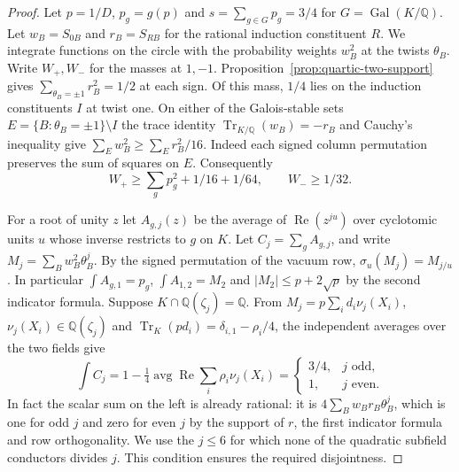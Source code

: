 \documentclass[11pt,a4paper]{article}
\numberwithin{equation}{section}
\begin{document}
\begin{proof}
Let $p=1/D$, $p_g=g(p)$ and $s=\sum_{g\in G}p_g=3/4$ for
$G=\operatorname{Gal}(K/\mathbb Q)$. Let $w_B=S_{0B}$ and
$r_B=S_{RB}$ for the rational induction constituent $R$.
We integrate functions on the circle with the probability weights
$w_B^2$ at the twists $\theta_B$. Write $W_+,W_-$ for the masses
at $1,-1$. Proposition~\ref{prop:quartic-two-support} gives
$\sum_{\theta_B=\pm1}r_B^2=1/2$ at each sign.
Of this mass, $1/4$ lies on the induction constituents $I$ at
twist one. On either of the Galois-stable sets
$E=\{B:\theta_B=\pm1\}\setminus I$ the trace identity
$\operatorname{Tr}_{K/\mathbb Q}(w_B)=-r_B$ and Cauchy's inequality
give $\sum_E w_B^2\ge\sum_E r_B^2/16$. Indeed each signed column
permutation preserves the sum of squares on $E$.
Consequently
\[
 W_+\ge \sum_g p_g^2+1/16+1/64,\qquad W_-\ge1/32.        \tag{1}
\]

For a root of unity $z$ let $A_{g,j}(z)$ be the average of
$\operatorname{Re}(z^{ju})$ over cyclotomic units $u$ whose inverse
restricts to $g$ on $K$. Let $C_j=\sum_g A_{g,j}$, and write
$M_j=\sum_B w_B^2\theta_B^j$. By the signed permutation of the
vacuum row, $\sigma_u(M_j)=M_{j/u}$. In particular
$\int A_{g,1}=p_g$, $\int A_{1,2}=M_2$ and
$|M_2|\le p+2\sqrt p$ by the second indicator formula.
Suppose $K\cap\mathbb Q(\zeta_j)=\mathbb Q$. From
$M_j=p\sum_i d_i\nu_j(X_i)$, $\nu_j(X_i)\in\mathbb Q(\zeta_j)$
and $\operatorname{Tr}_K(p d_i)=\delta_{i,1}-\rho_i/4$,
the independent averages over the two fields give
\[
 \int C_j=1-\tfrac14\operatorname{avg}\operatorname{Re}
                     \sum_i\rho_i\nu_j(X_i)
    =\begin{cases}3/4,&j\text{ odd},\\1,&j\text{ even}.\end{cases}   \tag{2}
\]
In fact the scalar sum on the left is already rational: it is
$4\sum_B w_Br_B\theta_B^j$, which is one for odd $j$ and zero
for even $j$ by the support of $r$, the first indicator formula and
row orthogonality. We use the $j\le6$ for which none of the
quadratic subfield conductors divides $j$. This condition ensures
the required disjointness.


\end{proof}
\end{document}
